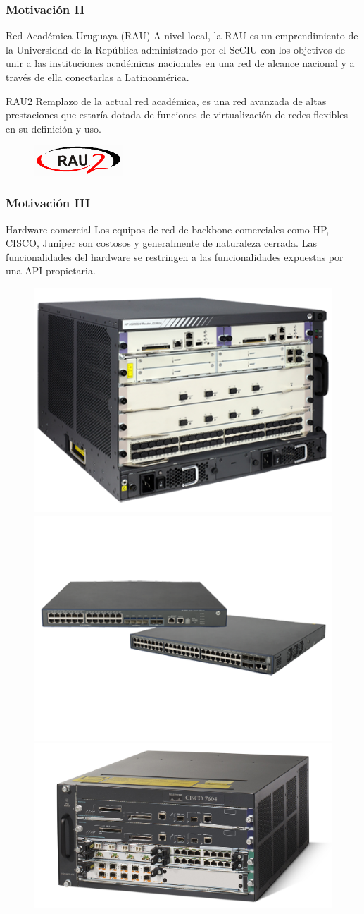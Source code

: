 \documentclass{beamer}
\begin{document}
\begin{frame}
\frametitle{Motivaci\'on II} 

\begin{block}{Red Académica Uruguaya (RAU)}
A nivel local, la RAU es un emprendimiento de la Universidad de la República administrado por el SeCIU con los objetivos de unir a las instituciones académicas nacionales en una red de alcance nacional y a trav\'es de ella conectarlas a Latinoam\'erica. 
\end{block}

\begin{block}{RAU2}
Remplazo de la actual red académica, es una red avanzada de altas prestaciones que estar\'ia dotada de funciones de virtualizaci\'on de redes flexibles en su definici\'on y uso.
\end{block}

\begin{figure}[h] 
\centering    
\includegraphics[width=0.3\textwidth]{imagenes/logorau2.png}
\label{fig:RAU}
\end{figure}

\end{frame}

\begin{frame}
\frametitle{Motivaci\'on III} 

\begin{block}{Hardware comercial}
Los equipos de red de backbone comerciales como HP, CISCO, Juniper son costosos y generalmente de naturaleza cerrada. Las funcionalidades del hardware se restringen a las funcionalidades expuestas por una API propietaria. 
\end{block}

\begin{figure}[htp]
\centering
\includegraphics[width=.25\textwidth]{imagenes/corerouter2.png}\hfill
\includegraphics[width=.35\textwidth]{imagenes/corerouter1.png}\hfill
\includegraphics[width=.35\textwidth]{imagenes/corerouter3.jpg}
\label{fig:figure3}
\end{figure}
\end{frame}
\end{document}

